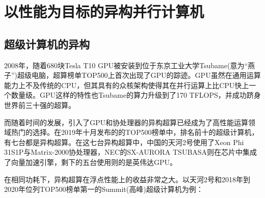 \documentclass[UTF8,a4paper,10pt]{ctexart}
\begin{document}
\section{以性能为目标的异构并行计算机}
\subsection{超级计算机的异构}
2008年，随着680块Tesla T10 GPU被安装到位于东京工业大学Tsubame(意为“燕子”)超级电脑，超算榜单TOP500上首次出现了GPU的踪迹。GPU虽然在通用运算能力上不及传统的CPU，但其具有的众核架构使得其在并行运算上比CPU快上一个数量级。GPU这样的特性也Tsubame的算力升级到了170 TFLOPS，并成功跻身世界前三十强的超算。\cite{tsubame_wiki}

而随着时间的发展，引入了GPU和协处理器的异构超算已经成为了高性能运算领域热门的选择。在2019年十月发布的的TOP500榜单中，排名前十的超级计算机，有七台都是异构超算。在这七台异构超算中，中国的天河2号使用了Xeon Phi 31S1P与Matrix-2000协处理器，NEC的SX-AURORA TSUBASA则在芯片中集成了向量加速引擎，剩下的五台使用则的是英伟达GPU。\cite{supercom_gpu}

在相同功耗下，异构超算在浮点性能上的收益非常之大。以天河2号和2018年到2020年位列TOP500榜单第一的Summit(高峰)超级计算机为例：


\end{document}

